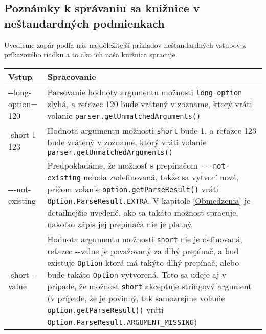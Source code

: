 \documentclass{article}
\begin{document}
\subsection{Poznámky k správaniu sa knižnice v neštandardných podmienkach}
Uvedieme zopár podľa nás najdôležitejší príkladov neštandardných vstupov z príkazového riadku a to ako ich naša knižnica spracuje.
\begin{table}[h]
\centering
\begin{tabular}{|p{}|p{}|}
     \hline
     \textbf{Vstup} & \textbf{Spracovanie} \\
     \hline
     -{}-long-option= 120 & Parsovanie hodnoty argumentu možnosti \texttt{long-option} zlyhá, a reťazec 120 bude vrátený v zozname, ktorý vráti volanie \texttt{parser.getUnmatchedArguments()} \\
     \hline
     -short 1 123 & Hodnota argumentu možnosti \texttt{short} bude 1, a reťazec 123 bude vrátený v zozname, ktorý vráti volanie \texttt{parser.getUnmatchedArguments()} \\
     \hline
     -{}-{}-not-existing & Predpokladáme, že možnosť s prepínačom \texttt{-{}-{}-{}not-existing} nebola zadefinovaná, takže sa vytvorí nová, pričom volanie \texttt{option.getParseResult()} vráti \texttt{Option.ParseResult.EXTRA}. V kapitole \ref{Obmedzenia} je detailnejšie uvedené, ako sa takáto možnosť spracuje, nakoľko zápis jej prepínača nie je platný. \\
     \hline
     -short -{}-value & Hodnota argumentu možnosti \texttt{short} nie je definovaná, reťazec -{}-value je považovaný za dlhý prepínač, a bud existuje \texttt{Option} ktorá má takýto dlhý prepínač, alebo bude takáto \texttt{Option} vytvorená. Toto sa udeje aj v prípade, že možnosť \texttt{short} akceptuje stringový argument (v prípade, že je povinný, tak samozrejme volanie \texttt{option.getParseResult()} vráti \texttt{Option.ParseResult.ARGUMENT\_MISSING}) \\
     \hline
\end{tabular}
\end{table}
\end{document}
